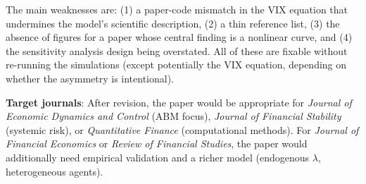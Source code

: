 \documentclass[12pt,a4paper]{article}
\begin{document}
The main weaknesses are: (1) a paper-code mismatch in the VIX equation that undermines the model's scientific description, (2) a thin reference list, (3) the absence of figures for a paper whose central finding is a nonlinear curve, and (4) the sensitivity analysis design being overstated. All of these are fixable without re-running the simulations (except potentially the VIX equation, depending on whether the asymmetry is intentional).

\textbf{Target journals}: After revision, the paper would be appropriate for \emph{Journal of Economic Dynamics and Control} (ABM focus), \emph{Journal of Financial Stability} (systemic risk), or \emph{Quantitative Finance} (computational methods). For \emph{Journal of Financial Economics} or \emph{Review of Financial Studies}, the paper would additionally need empirical validation and a richer model (endogenous $\lambda$, heterogeneous agents).
\end{document}
